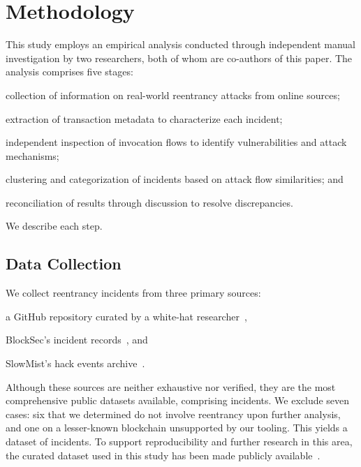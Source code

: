 \section{Methodology}
\label{sec:methodology}

This study employs an empirical analysis conducted through independent manual investigation by two researchers, both of whom are co-authors of this paper. The analysis comprises five stages: 
\begin{enumerate*}
    \item collection of information on real-world reentrancy attacks from online sources;
    \item extraction of transaction metadata to characterize each incident;
    \item independent inspection of invocation flows to identify vulnerabilities and attack mechanisms;
    \item clustering and categorization of incidents based on attack flow similarities; and
    \item reconciliation of results through discussion to resolve discrepancies.
\end{enumerate*}
We describe each step. 


\subsection{Data Collection}
\label{methodology:data-collection}

We collect reentrancy incidents from three primary sources: 
\begin{enumerate*}  
    \item a GitHub repository curated by a white-hat researcher~\cite{reentrancy-list-pcaversaccio},  
    \item BlockSec's incident records~\cite{blocksec-security-incidents}, and  
    \item SlowMist's hack events archive~\cite{slowmist-hacked}.  
\end{enumerate*}  
Although these sources are neither exhaustive nor verified, they are the most comprehensive public datasets available, comprising \ReentrancyTotalRecord{} incidents. We exclude seven cases: six that we determined do not involve reentrancy upon further analysis, and one on a lesser-known blockchain unsupported by our tooling. This yields a dataset of \ReentrancyTotalAnalyzed{} incidents. To support reproducibility and further research in this area, the curated dataset used in this study has been made publicly available~\cite{our-dataset}.

